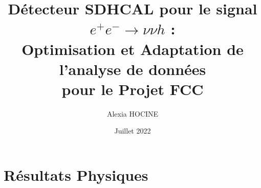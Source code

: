 \documentclass[10pt,a4paper]{report}
\author{Alexia \textsc{HOCINE}}
\title{
	Détecteur SDHCAL pour le signal  $ e^{+} e^{-} \longrightarrow \nu \nu h $ :\\
	Optimisation et Adaptation de l'analyse de données\\pour le Projet
 FCC 
}
\date{Juillet 2022}
\begin{document}


\tableofcontents







\chapter{Résultats Physiques}



%





\begin{appendix}

%

%


\end{appendix}




%





\end{document}
